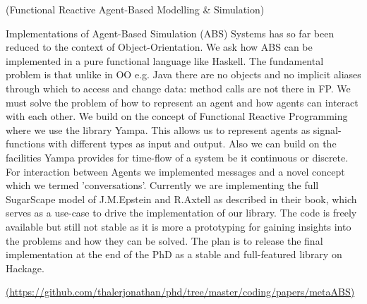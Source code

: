 \documentclass[DIV16,twocolumn,10pt]{scrreprt}
\begin{document}
\begin{hcarentry}{(Functional Reactive Agent-Based Modelling \& Simulation)}
\makeheader

Implementations of Agent-Based Simulation (ABS) Systems has so far been reduced to the context of Object-Orientation. We ask how ABS can be implemented in a pure functional language like Haskell. The fundamental problem is that unlike in OO e.g. Java there are no objects and no implicit aliases through which to access and change data: method calls are not there in FP. We must solve the problem of how to represent an agent and how agents can interact with each other. We build on the concept of Functional Reactive Programming where we use the library Yampa. This allows us to represent agents as signal-functions with different types as input and output. Also we can build on the facilities Yampa provides for time-flow of a system be it continuous or discrete. For interaction between Agents we implemented messages and a novel concept which we termed 'conversations'. Currently we are implementing the full SugarScape model of J.M.Epstein and R.Axtell as described in their book, which serves as a use-case to drive the implementation of our library. The code is freely available but still not stable as it is more a prototyping for gaining insights into the problems and how they can be solved. The plan is to release the final implementation at the end of the PhD as a stable and full-featured library on Hackage.

\FurtherReading
  \url{(https://github.com/thalerjonathan/phd/tree/master/coding/papers/metaABS)}
\end{hcarentry}
\end{document}

